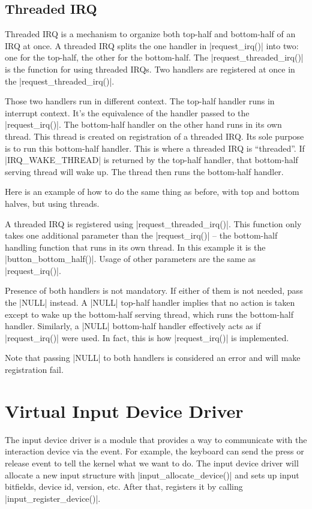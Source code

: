 \documentclass[10pt, oneside]{book}
\begin{document}

\subsection{Threaded IRQ}

Threaded IRQ is a mechanism to organize both top-half and bottom-half of an IRQ at once.
A threaded IRQ splits the one handler in \cpp|request_irq()| into two: one for the top-half, the other for the bottom-half.
The \cpp|request_threaded_irq()| is the function for using threaded IRQs.
Two handlers are registered at once in the \cpp|request_threaded_irq()|.

Those two handlers run in different context.
The top-half handler runs in interrupt context.
It's the equivalence of the handler passed to the \cpp|request_irq()|.
The bottom-half handler on the other hand runs in its own thread.
This thread is created on registration of a threaded IRQ.
Its sole purpose is to run this bottom-half handler.
This is where a threaded IRQ is ``threaded''.
If \cpp|IRQ_WAKE_THREAD| is returned by the top-half handler, that bottom-half serving thread will wake up.
The thread then runs the bottom-half handler.

Here is an example of how to do the same thing as before, with top and bottom halves, but using threads.


A threaded IRQ is registered using \cpp|request_threaded_irq()|.
This function only takes one additional parameter than the \cpp|request_irq()| -- the bottom-half handling function that runs in its own thread.
In this example it is the \cpp|button_bottom_half()|.
Usage of other parameters are the same as \cpp|request_irq()|.

Presence of both handlers is not mandatory.
If either of them is not needed, pass the \cpp|NULL| instead.
A \cpp|NULL| top-half handler implies that no action is taken except to wake up the bottom-half serving thread, which runs the bottom-half handler.
Similarly, a \cpp|NULL| bottom-half handler effectively acts as if \cpp|request_irq()| were used.
In fact, this is how \cpp|request_irq()| is implemented.

Note that passing \cpp|NULL| to both handlers is considered an error and will make registration fail.

\section{Virtual Input Device Driver}
\label{sec:vinput}
The input device driver is a module that provides a way to communicate with the interaction device via the event.
For example, the keyboard can send the press or release event to tell the kernel what we want to do.
The input device driver will allocate a new input structure with \cpp|input_allocate_device()| and sets up input bitfields, device id, version, etc.
After that, registers it by calling \cpp|input_register_device()|.
\end{document}
